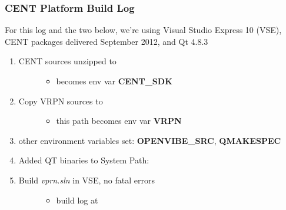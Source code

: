 \documentclass[letterpaper,10pt,english]{sphinxmanual}
\begin{document}
\subsubsection{CENT Platform Build Log}
\label{index:cent-platform-build-log}
For this log and the two below, we're using Visual Studio Express 10 (VSE), CENT packages delivered September 2012, and Qt 4.8.3
\begin{enumerate}
\item {} \begin{description}
\item[{CENT sources unzipped to }] \leavevmode\begin{itemize}
\item {} 
 becomes env var \textbf{CENT\_SDK}

\end{itemize}

\end{description}

\item {} \begin{description}
\item[{Copy VRPN sources to }] \leavevmode\begin{itemize}
\item {} 
this path becomes env var \textbf{VRPN}

\end{itemize}

\end{description}

\item {} 
other environment variables set: \textbf{OPENVIBE\_SRC}, \textbf{QMAKESPEC}

\item {} 
Added QT binaries to System Path: 

\item {} \begin{description}
\item[{Build \emph{vprn.sln} in VSE, no fatal errors}] \leavevmode\begin{itemize}
\item {} 
build log at 


\end{itemize}
\end{description}
\end{enumerate}
\end{document}
